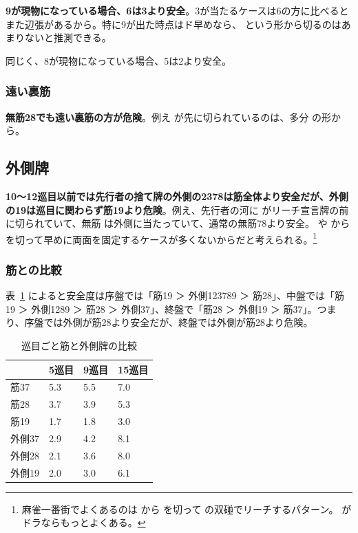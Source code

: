 \documentclass[../nankiru_main.tex]{subfiles}
\begin{document}
\textbf{9が現物になっている場合、6は3より安全}\citep[][pp. 45--46]{miinin-choice}。3が当たるケースは6の方に比べるとまた辺張があるから。特に9が出た時点はド早めなら、 という形から切るのはあまりないと推測できる。

同じく、8が現物になっている場合、5は2より安全。

\subsubsection*{遠い裏筋}

\textbf{無筋28でも遠い裏筋の方が危険}\citep[][pp.~175--176]{miinin-choice}。例え  が先に切られているのは、多分  の形から。

\subsection{外側牌}

\textbf{10〜12巡目以前では先行者の捨て牌の外側の2378は筋全体より安全だが、外側の19は巡目に関わらず筋19より危険}\citep[pp. 148--151]{miinin-stat}。例え、先行者の河に  がリーチ宣言牌の前に切られていて、無筋  は外側に当たっていて、通常の無筋78より安全。 や  から  を切って早めに両面を固定するケースが多くないからだと考えられる。\footnote{麻雀一番街でよくあるのは  から  を切って  の双碰でリーチするパターン。 がドラならもっとよくある。}

\subsubsection*{筋との比較} 

表~\ref{tab:dealin-rate-sotogawa} によると安全度は序盤では「筋19 ＞ 外側123789 ＞ 筋28」、中盤では「筋19 ＞ 外側1289 ＞ 筋28 ＞ 外側37」、終盤で「筋28 ＞ 外側19 ＞ 筋37」。つまり、序盤では外側が筋28より安全だが、終盤では外側が筋28より危険。

\begin{table}[ht]
  \centering
  \begin{tabular}{l|lll}
        & 5巡目 & 9巡目 & 15巡目 \\
    \hline
    筋37　 & 5.3 & 5.5 & 7.0 \\
    筋28　 & 3.7 & 3.9 & 5.3 \\
    筋19　 & 1.7 & 1.8 & 3.0 \\
    \hline
    外側37 & 2.9 & 4.2 & 8.1 \\
    外側28 & 2.1 & 3.6 & 8.0 \\
    外側19 & 2.0 & 3.0 & 6.1 \\
  \end{tabular}
  \caption{巡目ごと筋と外側牌の比較}
  \label{tab:dealin-rate-sotogawa}
\end{table}
\end{document}
